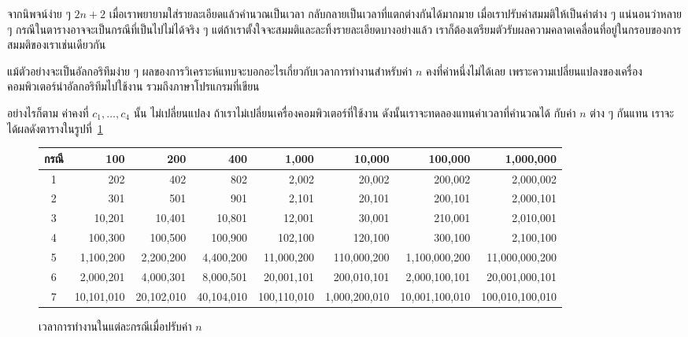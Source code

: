 จาก{\wbr}นิพจน์{\wbr}ง่าย ๆ $2n+2$ เมื่อ{\wbr}เรา{\wbr}พยายาม{\wbr}ใส่{\wbr}รายละเอียด{\wbr}แล้ว{\wbr}คำนวณ{\wbr}เป็น{\wbr}เวลา{\wbr}
กลับกลาย{\wbr}เป็น{\wbr}เวลา{\wbr}ที่{\wbr}แตกต่าง{\wbr}กัน{\wbr}ได้{\wbr}มากมาย เมื่อ{\wbr}เรา{\wbr}ปรับ{\wbr}ค่า{\wbr}สมมติ{\wbr}ให้{\wbr}เป็น{\wbr}ค่า{\wbr}ต่าง ๆ
แน่นอน{\wbr}ว่า{\wbr}หลาย ๆ กรณี{\wbr}ใน{\wbr}ตาราง{\wbr}อาจ{\wbr}จะ{\wbr}เป็น{\wbr}กรณี{\wbr}ที่{\wbr}เป็น{\wbr}ไป{\wbr}ไม่{\wbr}ได้{\wbr}จริง ๆ
แต่{\wbr}ถ้า{\wbr}เรา{\wbr}ตั้งใจ{\wbr}จะ{\wbr}สมมติ{\wbr}และ{\wbr}ละทิ้ง{\wbr}รายละเอียด{\wbr}บาง{\wbr}อย่าง{\wbr}แล้ว{\wbr}
เรา{\wbr}ก็{\wbr}ต้อง{\wbr}เตรียม{\wbr}ตัวรับ{\wbr}ผล{\wbr}ความ{\wbr}คลาดเคลื่อน{\wbr}ที่อยู่{\wbr}ใน{\wbr}กรอบ{\wbr}ของ{\wbr}การ{\wbr}สมมติ{\wbr}ของ{\wbr}เรา{\wbr}เช่นเดียวกัน{\wbr}

แม้{\wbr}ตัวอย่าง{\wbr}จะ{\wbr}เป็น{\wbr}อัล{\wbr}กอ{\wbr}ริ{\wbr}ทึม{\wbr}ง่าย ๆ
ผล{\wbr}ของ{\wbr}การ{\wbr}วิเคราะห์{\wbr}แทบ{\wbr}จะ{\wbr}บอก{\wbr}อะไร{\wbr}เกี่ยวกับ{\wbr}เวลา{\wbr}การ{\wbr}ทำงาน{\wbr}สำหรับ{\wbr}ค่า $n$
คงที่{\wbr}ค่า{\wbr}หนึ่ง{\wbr}ไม่{\wbr}ได้{\wbr}เลย เพราะ{\wbr}ความ{\wbr}เปลี่ยนแปลง{\wbr}ของ{\wbr}เครื่อง{\wbr}คอมพิวเตอร์{\wbr}นำ{\wbr}อัล{\wbr}กอ{\wbr}ริ{\wbr}ทึม{\wbr}ไป{\wbr}ใช้{\wbr}งาน{\wbr}
รวม{\wbr}ถึง{\wbr}ภาษา{\wbr}โปรแกรม{\wbr}ที่{\wbr}เขียน{\wbr}

อย่างไรก็ตาม ค่าคงที่ $c_1,\ldots,c_4$ นั้น ไม่{\wbr}เปลี่ยนแปลง{\wbr}
ถ้า{\wbr}เรา{\wbr}ไม่{\wbr}เปลี่ยน{\wbr}เครื่อง{\wbr}คอมพิวเตอร์{\wbr}ที่{\wbr}ใช้{\wbr}งาน ดังนั้น{\wbr}เรา{\wbr}จะ{\wbr}ทดลอง{\wbr}แทน{\wbr}ค่า{\wbr}เวลา{\wbr}ที่{\wbr}คำนวณ{\wbr}ได้ กับ{\wbr}ค่า{\wbr}
$n$ ต่าง ๆ กัน{\wbr}แทน เรา{\wbr}จะ{\wbr}ได้{\wbr}ผล{\wbr}ดัง{\wbr}ตาราง{\wbr}ใน{\wbr}รูป{\wbr}ที่~\ref{fig:analysis-runtimes-by-n}

\begin{figure}
{\small
\begin{center}
\begin{tabular}{|c|r|r|r|r|r|r|r|}
\hline
กรณี & 100 & 200 & 400	& 1,000	& 10,000	& 100,000	& 1,000,000\\ \hline
1& 202	&402	&802	&2,002	&20,002	&200,002	&2,000,002\\
2& 301	&501	&901	&2,101	&20,101	&200,101	&2,000,101\\
3& 10,201	&10,401	&10,801	&12,001	&30,001	&210,001	&2,010,001\\
4& 100,300	&100,500	&100,900	&102,100	&120,100	&300,100	&2,100,100\\
5& 1,100,200	&2,200,200	&4,400,200	&11,000,200	&110,000,200    &1,100,000,200	&11,000,000,200\\
6& 2,000,201	&4,000,301	&8,000,501	&20,001,101	&200,010,101    &2,000,100,101	&20,001,000,101\\
7& 10,101,010	&20,102,010	&40,104,010	&100,110,010	&1,000,200,010	&10,001,100,010	&100,010,100,010\\
\hline
\end{tabular}
\end{center}
}
\caption{เวลา{\wbr}การ{\wbr}ทำงาน{\wbr}ใน{\wbr}แต่ละ{\wbr}กรณี{\wbr}เมื่อ{\wbr}ปรับ{\wbr}ค่า $n$}
\label{fig:analysis-runtimes-by-n}
\end{figure}

